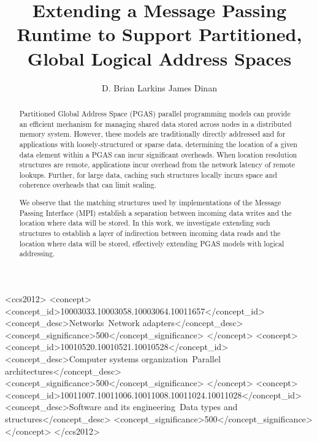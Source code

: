 \documentclass[prodmode]{acmsmall} %
\begin{document}

\title{Extending a Message Passing Runtime to Support Partitioned, Global Logical Address Spaces}
\author{D. Brian Larkins
James Dinan
}


\begin{abstract}

Partitioned Global Address Space (PGAS) parallel programming models can provide
an efficient mechanism for managing shared data stored across nodes in a
distributed memory system.  However, these models are traditionally directly
addressed and for applications with loosely-structured or sparse data,
determining the location of a given data element within a PGAS can incur
significant overheads.  When location resolution structures are remote,
applications incur overhead from the network latency of remote lookups.
Further, for large data, caching such structures locally incurs space and
coherence overheads that can limit scaling.

We observe that the matching structures used by implementations of the Message
Passing Interface (MPI) establish a separation between incoming data writes and
the location where data will be stored.  In this work, we investigate extending
such structures to establish a layer of indirection between incoming data reads
and the location where data will be stored, effectively extending PGAS models
with logical addressing.

\end{abstract}


%
%
\begin{CCSXML}
<ccs2012>
<concept>
<concept_id>10003033.10003058.10003064.10011657</concept_id>
<concept_desc>Networks~Network adapters</concept_desc>
<concept_significance>500</concept_significance>
</concept>
<concept>
<concept_id>10010520.10010521.10010528</concept_id>
<concept_desc>Computer systems organization~Parallel architectures</concept_desc>
<concept_significance>500</concept_significance>
</concept>
<concept>
<concept_id>10011007.10011006.10011008.10011024.10011028</concept_id>
<concept_desc>Software and its engineering~Data types and structures</concept_desc>
<concept_significance>500</concept_significance>
</concept>
</ccs2012>
\end{CCSXML}
\end{document}
